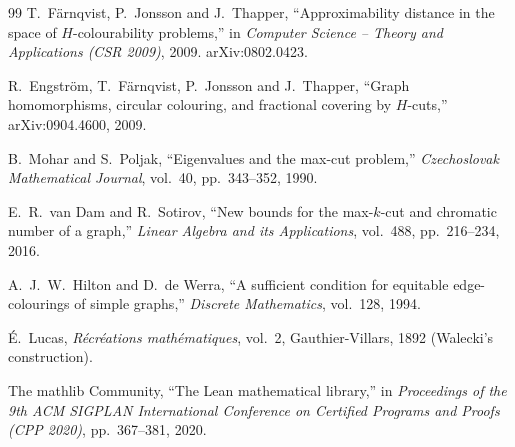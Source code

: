 \documentclass{article}
\theoremstyle{definition}
\begin{document}
\begin{thebibliography}{99}
T.~F\"arnqvist, P.~Jonsson and J.~Thapper,
``Approximability distance in the space of $H$-colourability problems,''
in \textit{Computer Science -- Theory and Applications (CSR 2009)}, 2009.
arXiv:0802.0423.

R.~Engstr\"om, T.~F\"arnqvist, P.~Jonsson and J.~Thapper,
``Graph homomorphisms, circular colouring, and fractional covering by
$H$-cuts,'' arXiv:0904.4600, 2009.

B.~Mohar and S.~Poljak,
``Eigenvalues and the max-cut problem,''
\textit{Czechoslovak Mathematical Journal}, vol.~40, pp.~343--352, 1990.

E.~R.~van Dam and R.~Sotirov,
``New bounds for the max-$k$-cut and chromatic number of a graph,''
\textit{Linear Algebra and its Applications}, vol.~488, pp.~216--234, 2016.

A.~J.~W.~Hilton and D.~de Werra,
``A sufficient condition for equitable edge-colourings of simple graphs,''
\textit{Discrete Mathematics}, vol.~128, 1994.

\'E.~Lucas,
\textit{R\'ecr\'eations math\'ematiques}, vol.~2, Gauthier-Villars, 1892
(Walecki's construction).

The mathlib Community,
``The Lean mathematical library,''
in \textit{Proceedings of the 9th ACM SIGPLAN International Conference on
Certified Programs and Proofs (CPP 2020)}, pp.~367--381, 2020.

\end{thebibliography}
\end{document}
